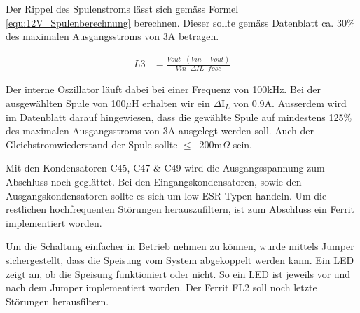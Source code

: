 Der Rippel des Spulenstroms lässt sich gemäss Formel \ref{equ:12V_Spulenberechnung} berechnen. Dieser sollte gemäss Datenblatt ca. 30\% des maximalen Ausgangsstroms von 3A betragen. 

\begin{align}
L3 &= \frac{Vout \cdot (Vin-Vout)}{Vin \cdot \Delta IL \cdot fosc}
\label{equ:12V_Spulenberechnung}
\end{align}

Der interne Oszillator läuft dabei bei einer Frequenz von 100kHz. Bei der ausgewählten Spule von 100$\mu$H erhalten wir ein $\Delta$I$_{L}$ von 0.9A. Ausserdem wird im Datenblatt darauf hingewiesen, dass die gewählte Spule auf mindestens 125\% des maximalen Ausgangsstroms von 3A ausgelegt werden soll. Auch der Gleichstromwiederstand der Spule sollte $ \leq \ $ 200m$\Omega$  sein. 

Mit den Kondensatoren C45, C47 \& C49 wird die Ausgangsspannung zum Abschluss noch geglättet. Bei den Eingangskondensatoren, sowie den Ausgangskondensatoren sollte es sich um low ESR Typen handeln. Um die restlichen hochfrequenten Störungen herauszufiltern, ist zum Abschluss ein Ferrit implementiert worden. 

Um die Schaltung einfacher in Betrieb nehmen zu können, wurde mittels Jumper sichergestellt, dass die Speisung vom System abgekoppelt werden kann. Ein LED zeigt an, ob die Speisung funktioniert oder nicht. So ein LED ist jeweils vor und nach dem Jumper implementiert worden. Der Ferrit FL2 soll noch letzte Störungen herausfiltern.

